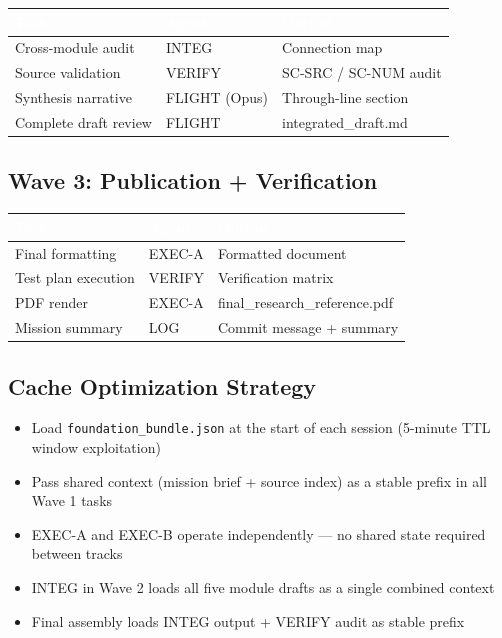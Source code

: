 \documentclass[11pt,letterpaper]{article}
\newcommand{\tableheader}[1]{\textbf{\sffamily\textcolor{white}{#1}}}
\begin{document}
\begin{center}
\begin{tabularx}{\textwidth}{L{2.5cm}L{2cm}X}
\toprule
{}
\tableheader{Task} & \tableheader{Agent} & \tableheader{Output} \\
\midrule
Cross-module audit & INTEG & Connection map \\
Source validation & VERIFY & SC-SRC / SC-NUM audit \\
Synthesis narrative & FLIGHT (Opus) & Through-line section \\
Complete draft review & FLIGHT & integrated\_draft.md \\
\bottomrule
\end{tabularx}
\end{center}

\subsection{Wave 3: Publication + Verification}

\begin{center}
\begin{tabularx}{\textwidth}{L{2.5cm}L{2cm}X}
\toprule
{}
\tableheader{Task} & \tableheader{Agent} & \tableheader{Output} \\
\midrule
Final formatting & EXEC-A & Formatted document \\
Test plan execution & VERIFY & Verification matrix \\
PDF render & EXEC-A & final\_research\_reference.pdf \\
Mission summary & LOG & Commit message + summary \\
\bottomrule
\end{tabularx}
\end{center}

\subsection{Cache Optimization Strategy}

\begin{itemize}[leftmargin=*]
  \item Load \texttt{foundation\_bundle.json} at the start of each session (5-minute TTL window exploitation)
  \item Pass shared context (mission brief + source index) as a stable prefix in all Wave 1 tasks
  \item EXEC-A and EXEC-B operate independently --- no shared state required between tracks
  \item INTEG in Wave 2 loads all five module drafts as a single combined context
  \item Final assembly loads INTEG output + VERIFY audit as stable prefix
\end{itemize}
\end{document}
